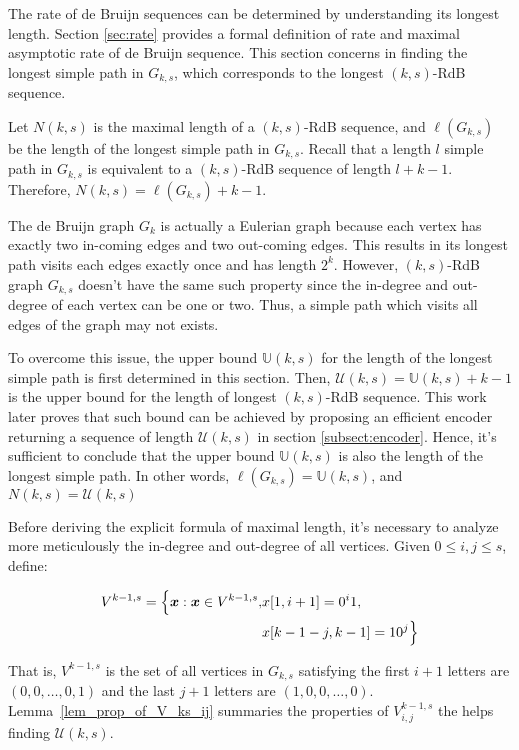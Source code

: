 The rate of de Bruijn sequences can be determined by understanding its longest length. Section \ref{sec:rate} provides a formal definition of rate and maximal asymptotic rate of de Bruijn sequence. This section concerns in finding the longest simple path in $G_{k,s}$, which corresponds to the longest $(k,s)$-RdB sequence.

Let $N(k,s)$ is the maximal length of a $(k,s)$-RdB sequence, and $\ell(G_{k,s})$ be the length of the longest simple path in $G_{k,s}$. Recall that a length $l$ simple path in $G_{k,s}$ is equivalent to a $(k,s)$-RdB sequence of length $l+k-1$. Therefore, $N(k,s) = \ell(G_{k,s})+k-1$. 

The de Bruijn graph $G_{k}$ is actually a Eulerian graph because each vertex has exactly two in-coming edges and two out-coming edges. This results in its longest path visits each edges exactly once and has length $2^{k}$. However, $(k,s)$-RdB graph $G_{k,s}$ doesn't have the same such property since the in-degree and out-degree of each vertex can be one or two. Thus, a simple path which visits all edges of the graph may not exists. 

To overcome this issue, the upper bound $\mathbb{U}(k,s)$ for the length of the longest simple path is first determined in this section. Then, $\mathcal{U}(k,s)=\mathbb{U}(k,s)+k-1$ is the upper bound for the length of longest $(k,s)$-RdB sequence. This work later proves that such bound can be achieved by proposing an efficient encoder returning a sequence of length $\mathcal{U}(k,s)$ in section \ref{subsect:encoder}. Hence, it's sufficient to conclude that the upper bound $\mathbb{U}(k,s)$ is also the length of the longest simple path. In other words, $\ell(G_{k,s})=\mathbb{U}(k,s)$, and $N(k,s)=\mathcal{U}(k,s)$

Before deriving the explicit formula of maximal length, it's necessary to analyze more meticulously the in-degree and out-degree of all vertices. Given $0\leq i,j\leq s$, define:

\begin{align*}
    V^{k-1,s} = \Bigl\{ {\boldsymbol x}: {\boldsymbol x}\in V^{k-1,s}, &x[1,i+1]=0^{i}1,  \\
    &x[k-1-j,k-1]=10^{j} \Bigl\}
\end{align*}

That is, $V^{k-1,s}$ is the set of all vertices in $G_{k,s}$ satisfying the first $i+1$ letters are $(0,0,\ldots,0,1)$ and the last $j+1$ letters are $(1,0,0,\ldots,0)$. Lemma~\ref{lem_prop_of_V_ks_ij} summaries the properties of $V^{k-1,s}_{i,j}$ the helps finding $\mathscr{U}(k,s)$.

